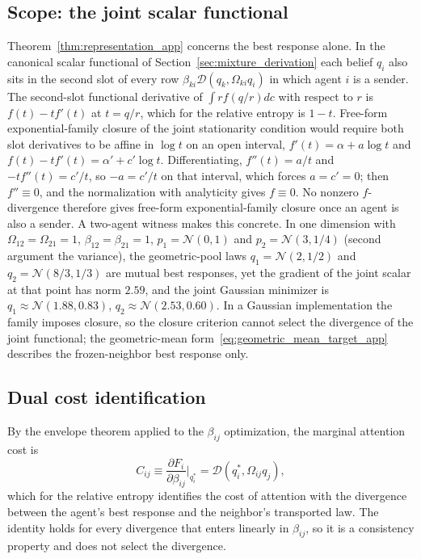 \documentclass[11pt]{article}
\begin{document}
\subsection*{Scope: the joint scalar functional}
Theorem~\ref{thm:representation_app} concerns the best response alone. In the canonical scalar functional of Section~\ref{sec:mixture_derivation} each belief $q_i$ also sits in the second slot of every row $\beta_{ki}\mathcal{D}(q_k, \Omega_{ki}q_i)$ in which agent $i$ is a sender. The second-slot functional derivative of $\int r f(q/r)dc$ with respect to $r$ is $f(t) - tf'(t)$ at $t = q/r$, which for the relative entropy is $1 - t$. Free-form exponential-family closure of the joint stationarity condition would require both slot derivatives to be affine in $\log t$ on an open interval, $f'(t) = \alpha + a\log t$ and $f(t) - tf'(t) = \alpha' + c'\log t$. Differentiating, $f''(t) = a/t$ and $-tf''(t) = c'/t$, so $-a = c'/t$ on that interval, which forces $a = c' = 0$; then $f'' \equiv 0$, and the normalization with analyticity gives $f \equiv 0$. No nonzero $f$-divergence therefore gives free-form exponential-family closure once an agent is also a sender. A two-agent witness makes this concrete. In one dimension with $\Omega_{12} = \Omega_{21} = 1$, $\beta_{12} = \beta_{21} = 1$, $p_1 = \mathcal{N}(0, 1)$ and $p_2 = \mathcal{N}(3, 1/4)$ (second argument the variance), the geometric-pool laws $q_1 = \mathcal{N}(2, 1/2)$ and $q_2 = \mathcal{N}(8/3, 1/3)$ are mutual best responses, yet the gradient of the joint scalar at that point has norm $2.59$, and the joint Gaussian minimizer is $q_1 \approx \mathcal{N}(1.88, 0.83)$, $q_2 \approx \mathcal{N}(2.53, 0.60)$. In a Gaussian implementation the family imposes closure, so the closure criterion cannot select the divergence of the joint functional; the geometric-mean form~\eqref{eq:geometric_mean_target_app} describes the frozen-neighbor best response only.

\subsection*{Dual cost identification}
By the envelope theorem applied to the $\beta_{ij}$ optimization, the marginal attention cost is
\begin{equation}
C_{ij} \equiv \frac{\partial F_i}{\partial\beta_{ij}}\bigg|_{q_i^*}
= \mathcal{D}(q_i^*,\Omega_{ij}q_j),
\end{equation}
which for the relative entropy identifies the cost of attention with the divergence between the agent's best response and the neighbor's transported law. The identity holds for every divergence that enters linearly in $\beta_{ij}$, so it is a consistency property and does not select the divergence.
\end{document}

